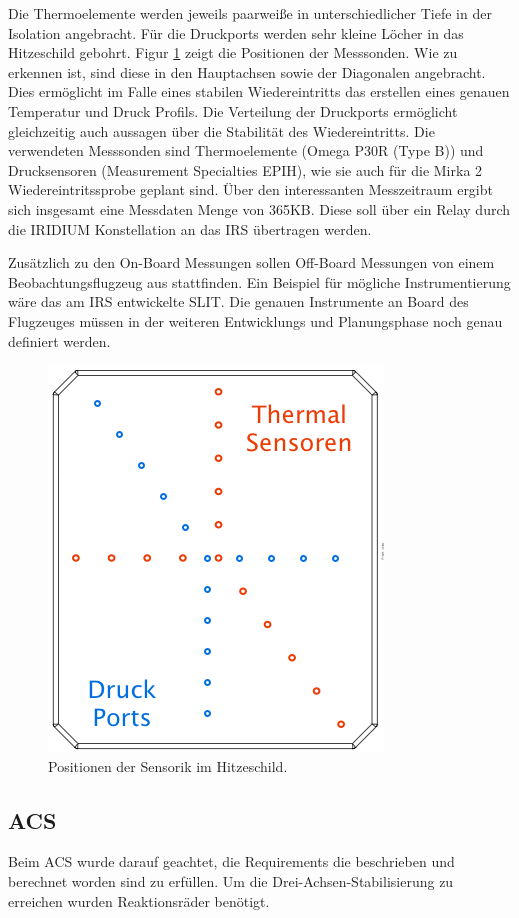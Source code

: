 \documentclass[twoside]{article}
\begin{document}
\begin{multicols}{2}
      Die Thermoelemente werden jeweils paarweiße in unterschiedlicher
      Tiefe in der Isolation angebracht. Für die Druckports werden sehr kleine Löcher in das
      Hitzeschild gebohrt. Figur \ref{fig:positioning} zeigt die Positionen der Messsonden.
      Wie zu erkennen ist, sind diese in den Hauptachsen sowie der Diagonalen angebracht.
      Dies ermöglicht im Falle eines stabilen Wiedereintritts das erstellen eines
      genauen Temperatur und Druck Profils. Die Verteilung der Druckports ermöglicht
      gleichzeitig auch aussagen über die Stabilität des Wiedereintritts.
      Die verwendeten Messsonden sind Thermoelemente (Omega P30R (Type B)) und Drucksensoren
      (Measurement Specialties EPIH), wie sie auch für die 
      Mirka 2 Wiedereintritssprobe geplant sind. Über den interessanten Messzeitraum
      ergibt sich insgesamt eine Messdaten Menge von 365KB. Diese soll über ein 
      Relay durch die IRIDIUM Konstellation an das IRS übertragen werden.

      Zusätzlich zu den On-Board Messungen sollen Off-Board Messungen von einem
      Beobachtungsflugzeug aus stattfinden. Ein Beispiel für mögliche Instrumentierung
      wäre das am IRS entwickelte SLIT. Die genauen Instrumente an Board des Flugzeuges
      müssen in der weiteren Entwicklungs und Planungsphase noch genau definiert werden.

      \begin{figure}[H]
         \captionsetup{format=plain}
         \centering
         \includegraphics[width=0.5 \linewidth]{Einbau.png}       
         \caption{Positionen der Sensorik im Hitzeschild.}
         \label{fig:positioning}
      \end{figure}   




      \subsection{ACS}
      Beim ACS wurde darauf geachtet, die Requirements die beschrieben und berechnet worden 
      sind zu erfüllen. Um die Drei-Achsen-Stabilisierung zu erreichen wurden Reaktionsräder benötigt.


\end{multicols}
\end{document}
